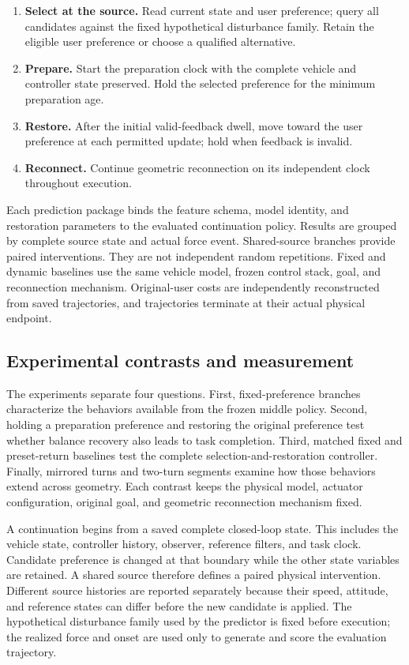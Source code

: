 \documentclass[journal]{IEEEtran}
\begin{document}
\begin{enumerate}
\item \textbf{Select at the source.} Read current state and user preference; query all candidates against the fixed hypothetical disturbance family. Retain the eligible user preference or choose a qualified alternative.

\item \textbf{Prepare.} Start the preparation clock with the complete vehicle and controller state preserved. Hold the selected preference for the minimum preparation age.

\item \textbf{Restore.} After the initial valid-feedback dwell, move toward the user preference at each permitted update; hold when feedback is invalid.

\item \textbf{Reconnect.} Continue geometric reconnection on its independent clock throughout execution.

\end{enumerate}
Each prediction package binds the feature schema, model identity, and restoration parameters to the evaluated continuation policy. Results are grouped by complete source state and actual force event. Shared-source branches provide paired interventions. They are not independent random repetitions. Fixed and dynamic baselines use the same vehicle model, frozen control stack, goal, and reconnection mechanism. Original-user costs are independently reconstructed from saved trajectories, and trajectories terminate at their actual physical endpoint.


\subsection{Experimental contrasts and measurement}

The experiments separate four questions. First, fixed-preference branches characterize the behaviors available from the frozen middle policy. Second, holding a preparation preference and restoring the original preference test whether balance recovery also leads to task completion. Third, matched fixed and preset-return baselines test the complete selection-and-restoration controller. Finally, mirrored turns and two-turn segments examine how those behaviors extend across geometry. Each contrast keeps the physical model, actuator configuration, original goal, and geometric reconnection mechanism fixed.


A continuation begins from a saved complete closed-loop state. This includes the vehicle state, controller history, observer, reference filters, and task clock. Candidate preference is changed at that boundary while the other state variables are retained. A shared source therefore defines a paired physical intervention. Different source histories are reported separately because their speed, attitude, and reference states can differ before the new candidate is applied. The hypothetical disturbance family used by the predictor is fixed before execution; the realized force and onset are used only to generate and score the evaluation trajectory.
\end{document}

